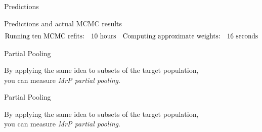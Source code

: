 \begin{frame}[t]{Predictions}
    \AlexanderPredictionFigOne{}
\end{frame}


\begin{frame}[t]{Predictions and actual MCMC results}
    \AlexanderPredictionFigTwo{}
    \vspace{-3em}
    $$
    \begin{aligned}
        \textrm{Running ten MCMC refits:}\quad & 10 \textrm{ hours} &
        \textrm{Computing approximate weights:}\quad &16 \textrm{ seconds}\\
    \end{aligned}
    $$
\end{frame}



\begin{frame}[t]{Partial Pooling}

By applying the same idea to subsets of the target population, \\you can measure
\emph{MrP partial pooling}.\\[3em]
\wholeslidefig{
\PartialPoolingPlot{}
}
\end{frame}




\begin{frame}[t]{Partial Pooling}

By applying the same idea to subsets of the target population, \\you can measure
\emph{MrP partial pooling}.\\[3em]
\wholeslidefig{
\PartialPoolingPlot{}
}
\end{frame}